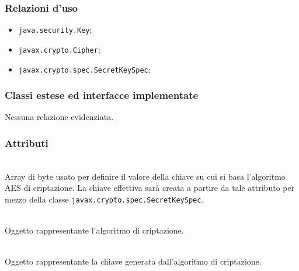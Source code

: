 \subsubsection*{Relazioni d'uso}
\begin{itemize}
	\item \texttt{java.security.Key};
	\item \texttt{javax.crypto.Cipher};
	\item \texttt{javax.crypto.spec.SecretKeySpec};
\end{itemize}

\subsubsection*{Classi estese ed interfacce implementate}

Nessuna relazione evidenziata.

\subsubsection*{Attributi}
\begin{description}
  \item{}\\
  Array di byte usato per definire il valore della chiave su cui si basa l'algoritmo AES di criptazione. La chiave effettiva sarà creata a partire da tale attributo per mezzo della classe \texttt{javax.crypto.spec.SecretKeySpec}.
  \item{}\\
  Oggetto rappresentante l'algoritmo di criptazione.
  \item{}\\
  Oggetto rappresentante la chiave generata dall'algoritmo di criptazione.
\end{description}

